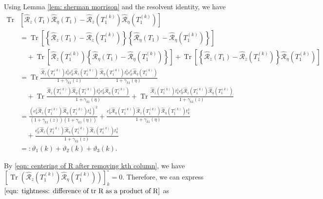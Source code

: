 \documentclass[12pt]{amsart}
\theoremstyle{plain}
\theoremstyle{definition}
\newcommand{\Tr}{\operatorname{Tr}}
\begin{document}
Using Lemma \ref{lem: sherman morrison} and the resolvent identity, we have
\begin{align*}
\Tr &\left[\hat{\mathcal{R}}_z(T_1) \hat{\mathcal{R}}_\eta(T_1)-\hat{\mathcal{R}}_z\left(T_{1}^{(k)}\right) \hat{\mathcal{R}}_\eta\left(T_{1}^{(k)}\right)\right] \\
&=\Tr \left[\left\{\hat{\mathcal{R}}_z(T_1)-\hat{\mathcal{R}}_z(T_{1}^{(k)})\right\} \left\{\hat{\mathcal{R}}_\eta(T_1)-\hat{\mathcal{R}}_\eta(T_{1}^{(k)})\right\}\right] \\
&\quad+\Tr \left[\hat{\mathcal{R}}_z\left(T_{1}^{(k)}\right)\left\{\hat{\mathcal{R}}_\eta(T_1)-\hat{\mathcal{R}}_\eta\left(T_{1}^{(k)}\right)\right\}\right]+\Tr \left[\left\{\hat{\mathcal{R}}_z(T_1)-\hat{\mathcal{R}}_z\left(T_{1}^{(k)}\right)\right\} \hat{\mathcal{R}}_\eta\left(T_{1}^{(k)}\right)\right] \\
&=\Tr  \frac{\hat{\mathcal{R}}_z\left(T_{1}^{(k)}\right) t_k^1 e_k^t \hat{\mathcal{R}}_z\left(T_{1}^{(k)}\right)}{1+\gamma_{k1}(z)} \frac{\hat{\mathcal{R}}_\eta\left(T_{1}^{(k)}\right) t_k^1 e_k^t \hat{\mathcal{R}}_\eta\left(T_{1}^{(k)}\right)}{1+\gamma_{k1}(\eta)} \\
&\quad+\Tr  \frac{\hat{\mathcal{R}}_z\left(T_{1}^{(k)}\right) \hat{\mathcal{R}}_\eta \left(T_{1}^{(k)}\right) t_k^1 e_k^t \hat{\mathcal{R}}_\eta \left(T_{1}^{(k)}\right)}{1+\gamma_{k1}(\eta)}+\Tr \frac{\hat{\mathcal{R}}_z\left(T_{1}^{(k)}\right) t_k^1 e_k^t \hat{\mathcal{R}}_z\left(T_{1}^{(k)}\right) \hat{\mathcal{R}}_\eta\left(T_{1}^{(k)}\right)}{1+\gamma_{k1}(z)} \\
&=\frac{\left(e_k^t \hat{\mathcal{R}}_z\left(T_{1}^{(k)}\right) \hat{\mathcal{R}}_\eta\left(T_{1}^{(k)}\right) t_k^1\right)^2}{\left(1+\gamma_{k1}(z)\right)\left(1+\gamma_{k1}(\eta)\right)}+\frac{e_k^t \hat{\mathcal{R}}_\eta\left(T_{1}^{(k)}\right) \hat{\mathcal{R}}_z\left(T_{1}^{(k)}\right) \hat{\mathcal{R}}_\eta\left(T_{1}^{(k)}\right) t_k^1}{1+\gamma_{k1}(\eta)} \\
&\quad+\frac{e_k^{t} \hat{\mathcal{R}}_z\left(T_{1}^{(k)}\right) \hat{\mathcal{R}}_\eta \left(T_{1}^{(k)}\right) \hat{\mathcal{R}}_z\left(T_{1}^{(k)}\right) t_k^1}{1+\gamma_{k1}(z)} \\
&=:\vartheta_1(k)+\vartheta_2(k)+\vartheta_3(k).
\end{align*}

By \eqref{eqn: centering of R after removing kth column}, we have $\left[\Tr  \left(\hat{\mathcal{R}}_z\left(T_{1}^{(k)}\right) \hat{\mathcal{R}}_\eta\left(T_{1}^{(k)}\right)\right)\right]_k^\circ=0$. Therefore, we can express $\eqref{eqn: tightness: difference of tr R as a product of R}$ as
\end{document}
